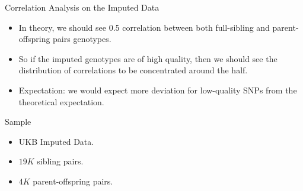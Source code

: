 \documentclass{beamer}
\begin{document}
\begin{frame}{Correlation Analysis on the Imputed Data}
      \begin{itemize}
          \item In theory, we should see 0.5 correlation between both full-sibling and parent-offspring pairs genotypes.
          \item So if the imputed genotypes are of high quality, then we should see the distribution of correlations to be concentrated around the half.
          \item Expectation: we would expect more deviation for low-quality SNPs from the theoretical expectation.
      \end{itemize}
\end{frame}


\begin{frame}{Sample}
      \begin{itemize}
            \item UKB Imputed Data.
            \item \(19K\) sibling pairs.
            \item \(4K\) parent-offspring pairs.
      \end{itemize}
\end{frame}
\end{document}
